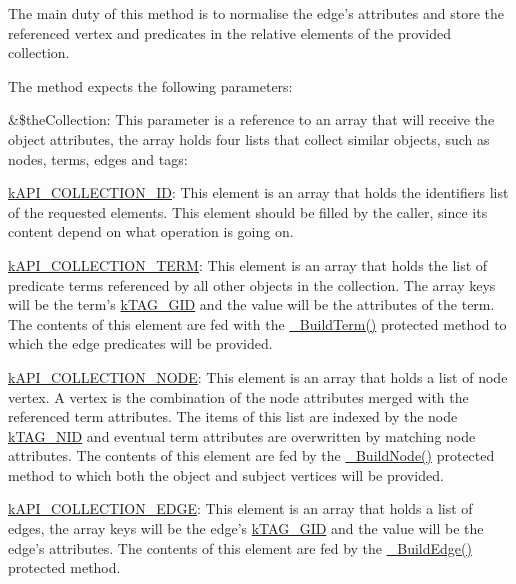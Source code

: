 The main duty of this method is to normalise the edge's attributes and store the referenced vertex and predicates in the relative elements of the provided collection.

The method expects the following parameters\-:


\begin{DoxyItemize}
\item {\ttfamily \&\$the\-Collection}\-: This parameter is a reference to an array that will receive the object attributes, the array holds four lists that collect similar objects, such as nodes, terms, edges and tags\-: 
\begin{DoxyItemize}
\item {\ttfamily \hyperlink{}{k\-A\-P\-I\-\_\-\-C\-O\-L\-L\-E\-C\-T\-I\-O\-N\-\_\-\-I\-D}}\-: This element is an array that holds the identifiers list of the requested elements. This element should be filled by the caller, since its content depend on what operation is going on. 
\item {\ttfamily \hyperlink{}{k\-A\-P\-I\-\_\-\-C\-O\-L\-L\-E\-C\-T\-I\-O\-N\-\_\-\-T\-E\-R\-M}}\-: This element is an array that holds the list of predicate terms referenced by all other objects in the collection. The array keys will be the term's \hyperlink{}{k\-T\-A\-G\-\_\-\-G\-I\-D} and the value will be the attributes of the term. The contents of this element are fed with the \hyperlink{class_c_ontology_wrapper_a7d37edd771ffa60b36ead632c2e46534}{\-\_\-\-Build\-Term()} protected method to which the edge predicates will be provided. 
\item {\ttfamily \hyperlink{}{k\-A\-P\-I\-\_\-\-C\-O\-L\-L\-E\-C\-T\-I\-O\-N\-\_\-\-N\-O\-D\-E}}\-: This element is an array that holds a list of node vertex. A vertex is the combination of the node attributes merged with the referenced term attributes. The items of this list are indexed by the node \hyperlink{}{k\-T\-A\-G\-\_\-\-N\-I\-D} and eventual term attributes are overwritten by matching node attributes. The contents of this element are fed by the \hyperlink{class_c_ontology_wrapper_a3149d34bb488513db2d572f3002bebce}{\-\_\-\-Build\-Node()} protected method to which both the object and subject vertices will be provided. 
\item {\ttfamily \hyperlink{}{k\-A\-P\-I\-\_\-\-C\-O\-L\-L\-E\-C\-T\-I\-O\-N\-\_\-\-E\-D\-G\-E}}\-: This element is an array that holds a list of edges, the array keys will be the edge's \hyperlink{}{k\-T\-A\-G\-\_\-\-G\-I\-D} and the value will be the edge's attributes. The contents of this element are fed by the \hyperlink{}{\-\_\-\-Build\-Edge()} protected method. 

\end{DoxyItemize}
\end{DoxyItemize}
